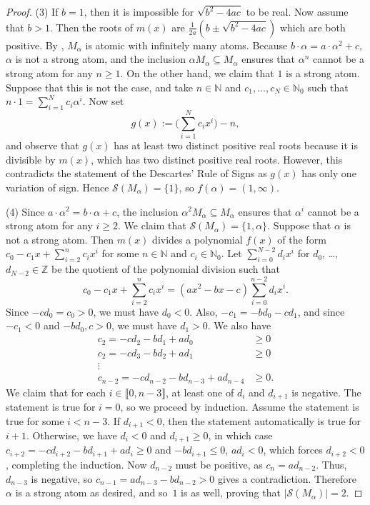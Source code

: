 \documentclass[11pt]{amsart}
\theoremstyle{definition}
\theoremstyle{remark}
\numberwithin{equation}{section}
\newcommand{\nn}{\mathbb{N}}
\newcommand{\Z}{\mathbb{Z}}
\providecommand\ldb{\llbracket}
\providecommand\rdb{\rrbracket}
\begin{document}
\begin{proof}
    (3) If $b=1$, then it is impossible for $\sqrt{b^2-4ac}$ to be real. Now assume that $b>1$. Then the roots of $m(x)$ are $\frac1{2a}(b \pm \sqrt{b^2-4ac})$ which are both positive. By , $M_\alpha$ is atomic with infinitely many atoms. Because $b\cdot \alpha = a\cdot \alpha^2+c$, $\alpha$ is not a strong atom, and the inclusion $\alpha M_\alpha \subseteq M_\alpha$ ensures that $\alpha^n$ cannot be a strong atom for any $n \ge 1$. On the other hand, we claim that $1$ is a strong atom. Suppose that this is not the case, and take $n \in \nn$ and $c_1, \dots, c_N \in \nn_0$ such that $n \cdot 1 = \sum_{i=1}^N c_i \alpha^i$. Now set
    \[
    	g(x) := \bigg( \sum_{i=1}^N c_i x^i \bigg) - n,
    \]
    and observe that $g(x)$ has at least two distinct positive real roots because it is divisible by $m(x)$, which has two distinct positive real roots. However, this contradicts the statement of the Descartes' Rule of Signs as $g(x)$ has only one variation of sign. Hence $\mathcal{S}(M_\alpha) = \{1\}$, so $f(\alpha) = (1, \infty)$.
    \smallskip
    
    (4) Since $a\cdot \alpha^2 = b\cdot \alpha +c$, the inclusion $\alpha^2 M_\alpha \subseteq M_\alpha$ ensures that $\alpha^i$ cannot be a strong atom for any $i \ge 2$. We claim that $\mathcal{S}(M_\alpha)=\{1,\alpha\}$. Suppose that $\alpha$ is not a strong atom. Then $m(x)$ divides a polynomial $f(x)$ of the form $c_0 - c_1x + \sum_{i=2}^n c_ix^i$ for some $n \in \nn$ and $c_i \in \nn_0$.
    Let $\sum_{i=0}^{N-2} d_i x^i$ for $d_0$, \dots, $d_{N - 2} \in \Z$
    be the quotient of the polynomial division such that
    \[
        c_0 - c_1x + \sum_{i = 2}^n c_ix^i
        = (ax^2 - bx - c)\sum_{i = 0}^{n - 2} d_ix^i.
    \]
    Since $-cd_0 = c_0 > 0$, we must have $d_0 < 0$.
    Also, $-c_1 = -bd_0 - cd_1$,
    and since $-c_1 < 0$ and $-bd_0, c > 0$, we must have $d_1 > 0$.
    We also have
    \begin{align*}
        c_2 = -cd_2 - bd_1 + ad_0 &\geq 0 \\
        c_2 = -cd_3 - bd_2 + ad_1 &\geq 0 \\
        \vdots\\
        c_{n - 2} = -cd_{n - 2} - bd_{n - 3} + ad_{n - 4} &\geq 0.
    \end{align*}
    We claim that for each $i \in \ldb 0, n - 3\rdb$, at least one of $d_i$ and $d_{i + 1}$ is negative.
    The statement is true for $i = 0$, so we proceed by induction. Assume the statement is true for some $i < n - 3$. If $d_{i + 1} < 0$, then the statement automatically is true for $i + 1$. Otherwise, we have $d_i < 0$ and $d_{i + 1} \geq 0$, in which case $c_{i + 2} = -cd_{i + 2} - bd_{i + 1} + ad_i \geq 0$
    and $-bd_{i + 1} \le 0$, $ad_i < 0$, which forces $d_{i + 2} < 0$, completing the induction.
    Now $d_{n - 2}$ must be positive, as $c_n = ad_{n - 2}$. Thus, $d_{n - 3}$ is negative,
    so $c_{n - 1} = ad_{n - 3} - bd_{n - 2} > 0$ gives a contradiction. Therefore $\alpha$ is a strong atom as desired, and so~$1$ is as well, proving that $|\mathcal{S}(M_\alpha)| = 2$.


\end{proof}
\end{document}
